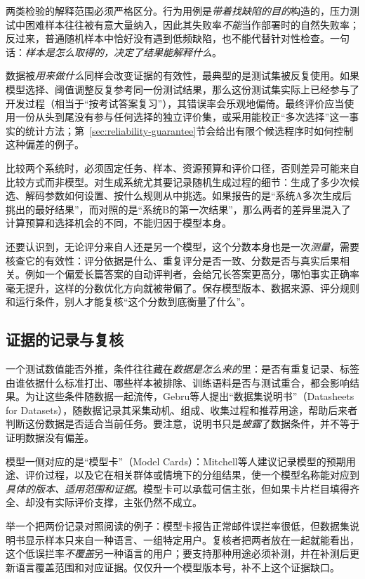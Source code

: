 两类检验的解释范围必须严格区分。行为用例是\emph{带着找缺陷的目的}构造的，压力测试中困难样本往往被有意大量纳入，因此其失败率\emph{不能}当作部署时的自然失败率；反过来，普通随机样本中恰好没有遇到低频缺陷，也不能代替针对性检查。一句话：\emph{样本是怎么取得的，决定了结果能解释什么}。

数据被\emph{用来做什么}同样会改变证据的有效性，最典型的是测试集被反复使用。如果模型选择、阈值调整反复参考同一份测试结果，那么这份测试集实际上已经参与了开发过程（相当于“按考试答案复习”），其错误率会乐观地偏倚。最终评价应当使用一份从头到尾没有参与任何选择的独立评价集，或采用能校正“多次选择”这一事实的统计方法；第~\ref{sec:reliability-guarantee}节会给出有限个候选程序时如何控制这种偏差的例子。

比较两个系统时，必须固定任务、样本、资源预算和评价口径，否则差异可能来自比较方式而非模型。对生成系统尤其要记录随机生成过程的细节：生成了多少次候选、解码参数如何设置、按什么规则从中挑选。如果报告的是“系统A多次生成后挑出的最好结果”，而对照的是“系统B的第一次结果”，那么两者的差异里混入了计算预算和选择机会的不同，不能归因于模型本身。

还要认识到，无论评分来自人还是另一个模型，这个分数本身也是一次\emph{测量}，需要核查它的有效性：评分依据是什么、重复评分是否一致、分数是否与真实后果相关。例如一个偏爱长篇答案的自动评判者，会给冗长答案更高分，哪怕事实正确率毫无提升，这样的分数优化方向就被带偏了。保存模型版本、数据来源、评分规则和运行条件，别人才能复核“这个分数到底衡量了什么”。

\subsection{证据的记录与复核}

一个测试数值能否外推，条件往往藏在\emph{数据是怎么来的}里：是否有重复记录、标签由谁依据什么标准打出、哪些样本被排除、训练语料是否与测试重合，都会影响结果。为让这些条件随数据一起流传，Gebru等人提出“数据集说明书”（Datasheets for Datasets），随数据记录其采集动机、组成、收集过程和推荐用途，帮助后来者判断这份数据是否适合当前任务。要注意，说明书只是\emph{披露}了数据条件，并不等于证明数据没有偏差。

模型一侧对应的是“模型卡”（Model Cards）：Mitchell等人建议记录模型的预期用途、评价过程，以及它在相关群体或情境下的分组结果，使一个模型名称能对应到\emph{具体的版本、适用范围和证据}。模型卡可以承载可信主张，但如果卡片栏目填得齐全、却没有实际评价支撑，主张仍然不成立。

举一个把两份记录对照阅读的例子：模型卡报告正常邮件误拦率很低，但数据集说明书显示样本只来自一种语言、一组特定用户。复核者把两者放在一起就能看出，这个低误拦率\emph{不覆盖}另一种语言的用户；要支持那种用途必须补测，并在补测后更新语言覆盖范围和对应证据。仅仅升一个模型版本号，补不上这个证据缺口。


